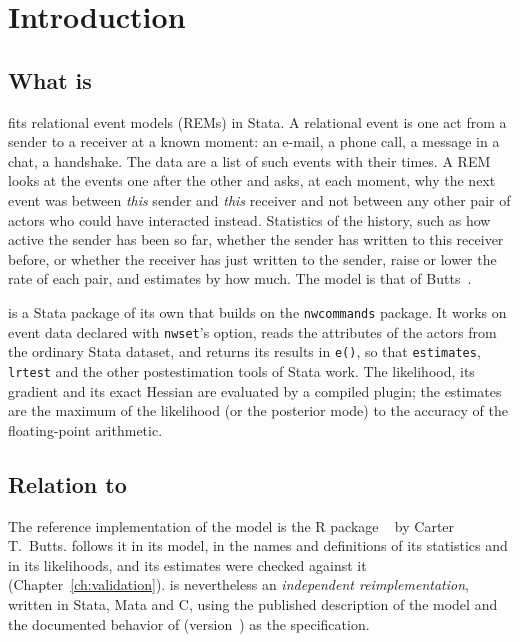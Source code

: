 \chapter{Introduction}\label{ch:intro}

\section{What \texorpdfstring{\nwrem}{nwrem} is}

\nwrem{} fits relational event models (REMs) in Stata. A relational event is one act from a sender to a receiver at a known moment: an e-mail, a phone call, a message in a chat, a handshake. The data are a list of such events with their times. A REM looks at the events one after the other and asks, at each moment, why the next event was between \emph{this} sender and \emph{this} receiver and not between any other pair of actors who could have interacted instead. Statistics of the history, such as how active the sender has been so far, whether the sender has written to this receiver before, or whether the receiver has just written to the sender, raise or lower the rate of each pair, and \nwrem{} estimates by how much. The model is that of Butts~\cite{butts2008}.

\nwrem{} is a Stata package of its own that builds on the \texttt{nwcommands} package. It works on event data declared with \texttt{nwset}'s  option, reads the attributes of the actors from the ordinary Stata dataset, and returns its results in \texttt{e()}, so that \texttt{estimates}, \texttt{lrtest} and the other postestimation tools of Stata work. The likelihood, its gradient and its exact Hessian are evaluated by a compiled plugin; the estimates are the maximum of the likelihood (or the posterior mode) to the accuracy of the floating-point arithmetic.

\section{Relation to \texorpdfstring{\relevent}{relevent}}

The reference implementation of the model is the R package \relevent{}~\cite{relevent} by Carter T.\ Butts. \nwrem{} follows it in its model, in the names and definitions of its statistics and in its likelihoods, and its estimates were checked against it (Chapter~\ref{ch:validation}). \nwrem{} is nevertheless an \emph{independent reimplementation}, written in Stata, Mata and C, using the published description of the model and the documented behavior of \relevent{} (version~\releventver{}) as the specification.

